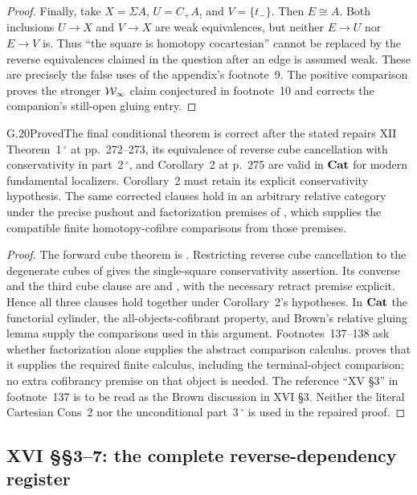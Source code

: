 \begin{proof}
Finally, take $X=\Sigma A$, $U=C_+A$, and $V=\{t_-\}$. Then $E\cong A$. Both inclusions $U\to X$ and $V\to X$ are weak equivalences, but neither $E\to U$ nor $E\to V$ is. Thus ``the square is homotopy cocartesian'' cannot be replaced by the reverse equivalences claimed in the question after an edge is assumed weak. These are precisely the false uses of the appendix's footnote~9. The positive comparison proves the stronger $\mathcal{W}_{\infty}$ claim conjectured in footnote~10 and corrects the companion's still-open gluing entry.
\end{proof}

\begin{claim}{G.20}{Proved}{The final conditional theorem is correct after the stated repairs}
XII Theorem~1\,$^\circ$ at pp.~272--273, its equivalence of reverse cube cancellation with conservativity in part~2\,$^\circ$, and Corollary~2 at p.~275 are valid in $\mathbf{Cat}$ for modern fundamental localizers. Corollary~2 must retain its explicit conservativity hypothesis. The same corrected clauses hold in an arbitrary relative category under the precise pushout and factorization premises of , which supplies the compatible finite homotopy-cofibre comparisons from those premises.
\end{claim}
\begin{proof}
The forward cube theorem is . Restricting reverse cube cancellation to the degenerate cubes of  gives the single-square conservativity assertion. Its converse and the third cube clause are  and , with the necessary retract premise explicit. Hence all three clauses hold together under Corollary~2's hypotheses. In $\mathbf{Cat}$ the functorial cylinder, the all-objects-cofibrant property, and Brown's relative gluing lemma supply the comparisons used in this argument. Footnotes~137--138 ask whether factorization alone supplies the abstract comparison calculus.  proves that it supplies the required finite calculus, including the terminal-object comparison; no extra cofibrancy premise on that object is needed. The reference ``XV \S3'' in footnote~137 is to be read as the Brown discussion in XVI \S3. Neither the literal Cartesian Cons~2 nor the unconditional part~3\,$^\circ$ is used in the repaired proof.
\end{proof}

\subsection{XVI \S\S3--7: the complete reverse-dependency register}

